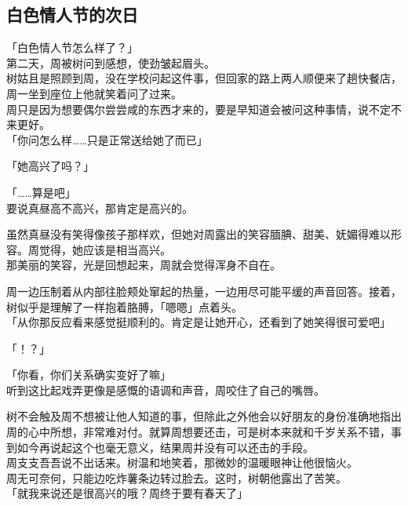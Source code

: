 \subsection{白色情人节的次日}

「白色情人节怎么样了？」\\

第二天，周被树问到感想，使劲皱起眉头。\\

树姑且是照顾到周，没在学校问起这件事，但回家的路上两人顺便来了趟快餐店，周一坐到座位上他就笑着问了过来。\\

周只是因为想要偶尔尝尝咸的东西才来的，要是早知道会被问这种事情，说不定不来更好。\\

「你问怎么样……只是正常送给她了而已」

「她高兴了吗？」

「……算是吧」\\

要说真昼高不高兴，那肯定是高兴的。

虽然真昼没有笑得像孩子那样欢，但她对周露出的笑容腼腆、甜美、妩媚得难以形容。周觉得，她应该是相当高兴。\\

那美丽的笑容，光是回想起来，周就会觉得浑身不自在。

周一边压制着从内部往脸颊处窜起的热量，一边用尽可能平缓的声音回答。接着，树似乎是理解了一样抱着胳膊，「嗯嗯」点着头。\\

「从你那反应看来感觉挺顺利的。肯定是让她开心，还看到了她笑得很可爱吧」

「！？」

「你看，你们关系确实变好了嘛」\\

听到这比起戏弄更像是感慨的语调和声音，周咬住了自己的嘴唇。

树不会触及周不想被让他人知道的事，但除此之外他会以好朋友的身份准确地指出周的心中所想，非常难对付。就算周想要还击，可是树本来就和千岁关系不错，事到如今再说起这个也毫无意义，结果周并没有可以还击的手段。\\

周支支吾吾说不出话来。树温和地笑着，那微妙的温暖眼神让他很恼火。\\

周无可奈何，只能边吃炸薯条边转过脸去。这时，树朝他露出了苦笑。\\

「就我来说还是很高兴的哦？周终于要有春天了」

